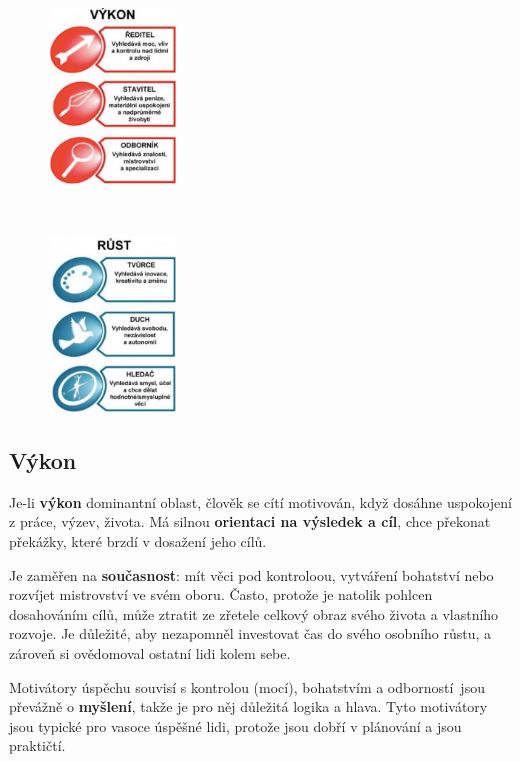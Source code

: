 \documentclass[a4paper,12pt]{report}
\begin{document}
\begin{figure}
\includegraphics[width=0.3\textwidth]{zdroje/motivace-vykon.png}

\

\includegraphics[width=0.3\textwidth]{zdroje/motivace-rust.png}
\end{figure}
\subsection[Výkon]{Výkon}

Je-li \textbf{výkon} dominantní oblast, člověk se cítí motivován, když dosáhne uspokojení z práce, výzev, života. Má silnou \textbf{orientaci na výsledek a cíl}, chce překonat překážky, které brzdí v dosažení jeho cílů.

Je zaměřen na \textbf{současnost}: mít věci pod kontroloou, vytváření bohatství nebo rozvíjet mistrovství ve svém oboru. Často, protože je natolik pohlcen dosahováním cílů, může ztratit ze zřetele celkový obraz svého života a vlastního rozvoje. Je důležité, aby nezapomněl investovat čas do svého osobního růstu, a zároveň si ovědomoval ostatní lidi kolem sebe.

Motivátory úspěchu souvisí s kontrolou (mocí), bohatstvím a odborností\ jsou převážně o \textbf{myšlení}, takže je pro něj důležitá logika a hlava. Tyto motivátory jsou typické pro vasoce úspěšné lidi, protože jsou dobří v plánování a jsou praktičtí.
\end{document}
